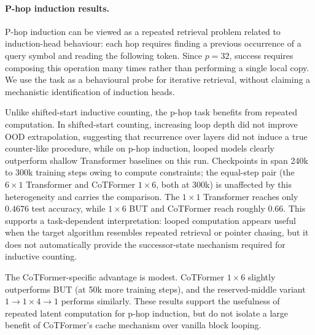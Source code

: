 \documentclass[10pt]{article}
\begin{document}
\paragraph{P-hop induction results.}

P-hop induction can be viewed as a repeated retrieval problem related to
induction-head behaviour: each hop requires finding a previous occurrence of a
query symbol and reading the following token. Since \(p=32\), success requires
composing this operation many times rather than performing a single local copy.
We use the task as a behavioural probe for iterative retrieval, without claiming
a mechanistic identification of induction heads.

Unlike shifted-start inductive counting, the p-hop task benefits from repeated computation. In shifted-start counting, increasing loop depth did not improve OOD extrapolation, suggesting that recurrence over layers did not induce a true counter-like procedure, while on p-hop induction, looped models clearly outperform shallow Transformer baselines on this run. Checkpoints in  span 240k to 300k training steps owing to compute constraints; the equal-step pair (the $6{\times}1$ Transformer and CoTFormer $1{\times}6$, both at 300k) is unaffected by this heterogeneity and carries the comparison. The \(1{\times}1\) Transformer reaches only \(0.4676\) test accuracy, while \(1{\times}6\) BUT and CoTFormer reach roughly \(0.66\). This supports a task-dependent interpretation: looped computation appears useful when the target algorithm resembles repeated retrieval or pointer chasing, but it does not automatically provide the successor-state mechanism required for inductive counting.

The CoTFormer-specific advantage is modest. CoTFormer \(1{\times}6\) slightly outperforms BUT (at 50k more training steps), and the reserved-middle variant \(1 \to 1{\times}4 \to 1\) performs similarly. These results support the usefulness of repeated latent computation for p-hop induction, but do not isolate a large benefit of CoTFormer's cache mechanism over vanilla block looping.
\end{document}

